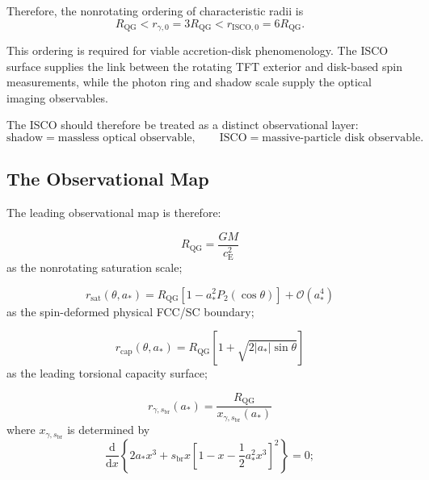 Therefore, the nonrotating ordering of characteristic radii is
\begin{equation}
    \boxed{ R_{\mathrm{QG}} < r_{\gamma,0}=3R_{\mathrm{QG}} < r_{\mathrm{ISCO},0}=6R_{\mathrm{QG}}. }
\end{equation}

This ordering is required for viable accretion-disk phenomenology. The ISCO surface supplies the link between the rotating TFT exterior and disk-based spin measurements, while the photon ring and shadow scale supply the optical imaging observables.

The ISCO should therefore be treated as a distinct observational layer:
\begin{equation}
    \boxed{ \text{shadow} = \text{massless optical observable}, \qquad \text{ISCO} = \text{massive-particle disk observable}. }
\end{equation}

\subsection{The Observational Map}

The leading observational map is therefore:

\begin{equation}
    \boxed{ R_{\mathrm{QG}} = \frac{GM}{c_{\mathrm{E}}^2} }
\end{equation}
as the nonrotating saturation scale;

\begin{equation}
    \boxed{ r_{\mathrm{sat}}(\theta,a_\ast) = R_{\mathrm{QG}} \left[ 1-a_\ast^2P_2(\cos\theta) \right] + \mathcal{O}(a_\ast^4) }
\end{equation}
as the spin-deformed physical FCC/SC boundary;

\begin{equation}
    \boxed{ r_{\mathrm{cap}}(\theta,a_\ast) = R_{\mathrm{QG}} \left[ 1+\sqrt{2|a_\ast|\sin\theta} \right] }
\end{equation}
as the leading torsional capacity surface;

\begin{equation}
    \boxed{ r_{\gamma,s_{\mathrm{br}}}(a_\ast) = \frac{R_{\mathrm{QG}}}{x_{\gamma,s_{\mathrm{br}}}(a_\ast)} }
\end{equation}
where $x_{\gamma,s_{\mathrm{br}}}$ is determined by
\begin{equation}
    \boxed{ \frac{\mathrm{d}}{\mathrm{d}x} \left\{ 2a_\ast x^3 + s_{\mathrm{br}} x \left[ 1-x-\frac{1}{2}a_\ast^2x^3 \right]^2 \right\} = 0; }
\end{equation}

